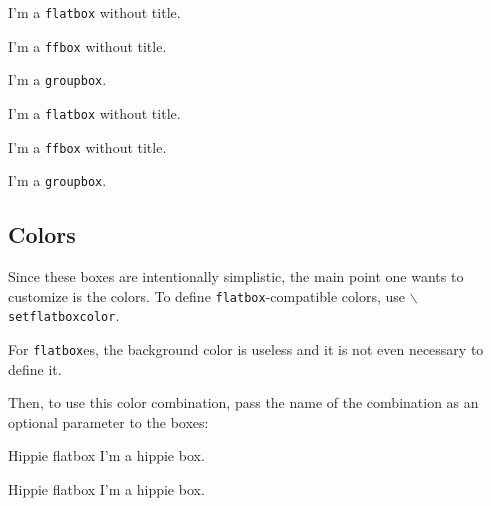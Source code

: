 \documentclass[a4paper]{article}
\begin{document}
\begin{flatbox}{}
I'm a \texttt{flatbox} without title.
\end{flatbox}

\begin{ffbox}{}
I'm a \texttt{ffbox} without title.
\end{ffbox}

\begin{groupbox}{}
I'm a \texttt{groupbox}.
\end{groupbox}

\begin{latexcode}
\begin{flatbox}{}
I'm a \texttt{flatbox} without title.
\end{flatbox}

\begin{ffbox}{}
I'm a \texttt{ffbox} without title.
\end{ffbox}

\begin{groupbox}{}
I'm a \texttt{groupbox}.
\end{groupbox}
\end{latexcode}

\subsection{Colors}
Since these boxes are intentionally simplistic, the main point one wants to
customize is the colors. To define \texttt{flatbox}-compatible colors, use \texttt{$\backslash$setflatboxcolor}.

\begin{latexcode}
\end{latexcode}

For \texttt{flatbox}es, the background color is useless and it is not even
necessary to define it.

Then, to use this color combination, pass the name of the combination as an
optional parameter to the boxes:

\begin{latexcode}
\begin{flatbox}[hippie]{Hippie flatbox}
I'm a hippie box.
\end{flatbox}

\begin{ffbox}[hippie]{Hippie flatbox}
I'm a hippie box.
\end{ffbox}
\end{latexcode}
\end{document}
